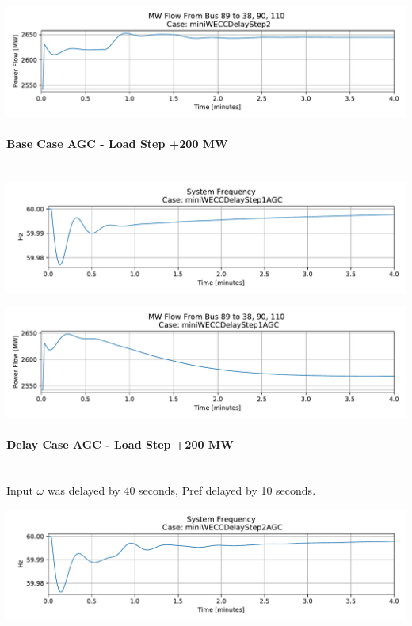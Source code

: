 \documentclass[12pt]{article}
\begin{document}
\includegraphics[width=\linewidth]{figures/miniWECCDelayStep2MWflow89to38-90-110}

\pagebreak

\paragraph{Base Case AGC -  Load Step +200 MW} \ \\

\includegraphics[width=\linewidth]{figures/miniWECCDelayStep1AGCFreq}

\includegraphics[width=\linewidth]{figures/miniWECCDelayStep1AGCMWflow89to38-90-110}

\paragraph{Delay Case AGC - Load Step +200 MW} \ \\
Input $\omega$ was delayed by 40 seconds, Pref delayed by 10 seconds.

\includegraphics[width=\linewidth]{figures/miniWECCDelayStep2AGCFreq}
\end{document}
